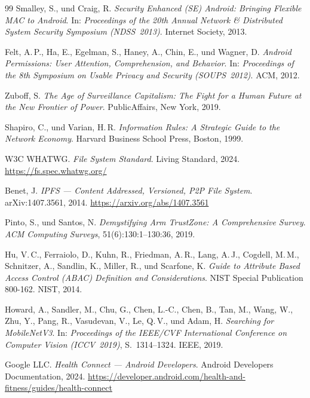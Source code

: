 ﻿\documentclass[12pt, a4paper]{article}
\begin{document}
\begin{thebibliography}{99}
Smalley, S., und Craig, R.
\newblock \emph{Security Enhanced (SE) Android: Bringing Flexible MAC to Android}.
\newblock In: \emph{Proceedings of the 20th Annual Network \& Distributed System
  Security Symposium (NDSS~2013)}. Internet Society, 2013.

Felt, A.\,P., Ha, E., Egelman, S., Haney, A., Chin, E., und Wagner, D.
\newblock \emph{Android Permissions: User Attention, Comprehension, and Behavior}.
\newblock In: \emph{Proceedings of the 8th Symposium on Usable Privacy and Security
  (SOUPS~2012)}. ACM, 2012.

Zuboff, S.
\newblock \emph{The Age of Surveillance Capitalism: The Fight for a Human Future
  at the New Frontier of Power}.
\newblock PublicAffairs, New York, 2019.

Shapiro, C., und Varian, H.\,R.
\newblock \emph{Information Rules: A Strategic Guide to the Network Economy}.
\newblock Harvard Business School Press, Boston, 1999.

W3C WHATWG.
\newblock \emph{File System Standard}.
\newblock Living Standard, 2024.
\newblock \url{https://fs.spec.whatwg.org/}

Benet, J.
\newblock \emph{IPFS --- Content Addressed, Versioned, P2P File System}.
\newblock arXiv:1407.3561, 2014.
\newblock \url{https://arxiv.org/abs/1407.3561}

Pinto, S., und Santos, N.
\newblock \emph{Demystifying Arm TrustZone: A Comprehensive Survey}.
\newblock \emph{ACM Computing Surveys}, 51(6):130:1--130:36, 2019.

Hu, V.\,C., Ferraiolo, D., Kuhn, R., Friedman, A.\,R., Lang, A.\,J.,
  Cogdell, M.\,M., Schnitzer, A., Sandlin, K., Miller, R., und Scarfone, K.
\newblock \emph{Guide to Attribute Based Access Control (ABAC) Definition and
  Considerations}.
\newblock NIST Special Publication 800-162. NIST, 2014.

Howard, A., Sandler, M., Chu, G., Chen, L.-C., Chen, B., Tan, M., Wang, W.,
  Zhu, Y., Pang, R., Vasudevan, V., Le, Q.\,V., und Adam, H.
\newblock \emph{Searching for MobileNetV3}.
\newblock In: \emph{Proceedings of the IEEE/CVF International Conference on
  Computer Vision (ICCV~2019)}, S.~1314--1324. IEEE, 2019.

Google LLC.
\newblock \emph{Health Connect --- Android Developers}.
\newblock Android Developers Documentation, 2024.
\newblock \url{https://developer.android.com/health-and-fitness/guides/health-connect}


\end{thebibliography}
\end{document}
